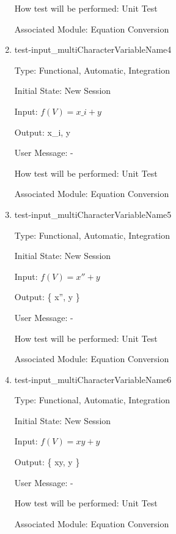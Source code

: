 \documentclass[12pt, titlepage]{article}
\begin{document}
\begin{enumerate}
	How test will be performed: Unit Test
	
	Associated Module: Equation Conversion\\
	
	\item{test-input\_multiCharacterVariableName4}
	
	Type: Functional, Automatic, Integration
	
	Initial State: New Session
	
	Input: $f(V) = x\_i + y$
	
	Output: { x\_i, y }
	
	User Message: - 
	
	How test will be performed: Unit Test
	
	Associated Module: Equation Conversion\\
	
	\item{test-input\_multiCharacterVariableName5}
	
	Type: Functional, Automatic, Integration
	
	Initial State: New Session
	
	Input: $f(V) = x'' + y$
	
	Output: \{ x'', y \}
	
	User Message: - 
	
	How test will be performed: Unit Test
	
	Associated Module: Equation Conversion\\
	
	\item{test-input\_multiCharacterVariableName6}
	
	Type: Functional, Automatic, Integration
	
	Initial State: New Session
	
	Input: $f(V) = xy + y$
	
	Output: \{ xy, y \}
	
	User Message: - 
	
	How test will be performed: Unit Test
	
	Associated Module: Equation Conversion\\
	
%	
%	
%	
%	
%	
%	
	
\end{enumerate}
\end{document}
